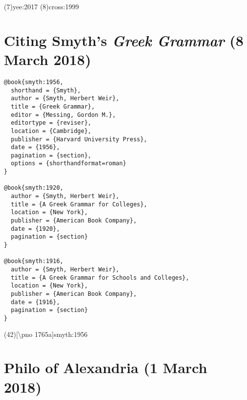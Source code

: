\documentclass[a4paper]{article}
\newcommand*{\pno}{\textbackslash pno }
\begin{document}
\examplecite(7){yee:2017}
\examplecite(8){cross:1999}
\exampleabbreviations
\examplebibliography
{}

\section{Citing Smyth's \emph{Greek Grammar} (8 March 2018)}

\begin{verbatim}
@book{smyth:1956,
  shorthand = {Smyth},
  author = {Smyth, Herbert Weir},
  title = {Greek Grammar},
  editor = {Messing, Gordon M.},
  editortype = {reviser},
  location = {Cambridge},
  publisher = {Harvard University Press},
  date = {1956},
  pagination = {section},
  options = {shorthandformat=roman}
}

@book{smyth:1920,
  author = {Smyth, Herbert Weir},
  title = {A Greek Grammar for Colleges},
  location = {New York},
  publisher = {American Book Company},
  date = {1920},
  pagination = {section}
}

@book{smyth:1916,
  author = {Smyth, Herbert Weir},
  title = {A Greek Grammar for Schools and Colleges},
  location = {New York},
  publisher = {American Book Company},
  date = {1916},
  pagination = {section}
}
\end{verbatim}

\examplecite(42)[\pno 1765a]{smyth:1956}
\begin{verbcite}
  \nocite{smyth:1920, smyth:1916}
\end{verbcite}
\exampleabbreviations
\examplebibliography
{}

\section{Philo of Alexandria (1 March 2018)}
\end{document}
